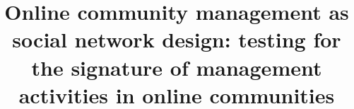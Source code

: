 \documentclass{bmcart}
\begin{document}
\begin{frontmatter}

\begin{fmbox}


\title{Online community management as social network design: testing for the signature of management activities in online communities}


\author[
   addressref={aff1, aff2},
   corref={aff2},                       %
   email={alberto@edgeryders.eu}
]{ }
\author[
   addressref={aff3,aff4},
   email={Guy.Melancon@u-bordeaux.fr}
]{ }
\author[
   addressref={aff5,aff6},
   email={renoust@nii.ac.jp}
]{ }


\address[id=aff1]{%
  , %
  ,                              %
}
\address[id=aff2]{%
  ,
  ,
}
\address[id=aff3]{%
  ,
  ,
}
\address[id=aff4]{%
}
\address[id=aff5]{%
  ,
}


\end{fmbox}
\end{frontmatter}
\end{document}
